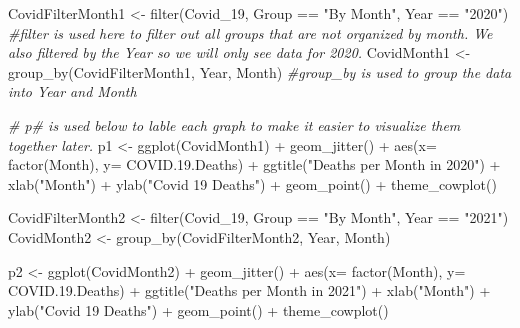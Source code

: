 \documentclass[
]{article}
\newenvironment{Shaded}{\begin{snugshade}}{\end{snugshade}}
\newcommand{\AttributeTok}[1]{\textcolor[rgb]{0.77,0.63,0.00}{#1}}
\newcommand{\CommentTok}[1]{\textcolor[rgb]{0.56,0.35,0.01}{\textit{#1}}}
\newcommand{\FloatTok}[1]{\textcolor[rgb]{0.00,0.00,0.81}{#1}}
\newcommand{\FunctionTok}[1]{\textcolor[rgb]{0.00,0.00,0.00}{#1}}
\newcommand{\NormalTok}[1]{#1}
\newcommand{\OtherTok}[1]{\textcolor[rgb]{0.56,0.35,0.01}{#1}}
\newcommand{\SpecialCharTok}[1]{\textcolor[rgb]{0.00,0.00,0.00}{#1}}
\newcommand{\StringTok}[1]{\textcolor[rgb]{0.31,0.60,0.02}{#1}}
\begin{document}
\begin{Shaded}
\begin{Highlighting}[]
\NormalTok{CovidFilterMonth1 }\OtherTok{\textless{}{-}} \FunctionTok{filter}\NormalTok{(Covid\_19, Group }\SpecialCharTok{==} \StringTok{"By Month"}\NormalTok{, Year }\SpecialCharTok{==} \StringTok{"2020"}\NormalTok{) }\CommentTok{\#filter is used here to filter out all groups that are not organized by month. We also filtered by the Year so we will only see data for 2020.}
\NormalTok{CovidMonth1 }\OtherTok{\textless{}{-}} \FunctionTok{group\_by}\NormalTok{(CovidFilterMonth1, Year, Month) }\CommentTok{\#group\_by is used to group the data into Year and Month}

\CommentTok{\# p\# is used below to lable each graph to make it easier to visualize them together later.}
\NormalTok{p1 }\OtherTok{\textless{}{-}} \FunctionTok{ggplot}\NormalTok{(CovidMonth1) }\SpecialCharTok{+}
  \FunctionTok{geom\_jitter}\NormalTok{() }\SpecialCharTok{+} 
  \FunctionTok{aes}\NormalTok{(}\AttributeTok{x=} \FunctionTok{factor}\NormalTok{(Month), }\AttributeTok{y=}\NormalTok{ COVID.}\FloatTok{19.}\NormalTok{Deaths) }\SpecialCharTok{+} 
    \FunctionTok{ggtitle}\NormalTok{(}\StringTok{"Deaths per Month in 2020"}\NormalTok{) }\SpecialCharTok{+} 
  \FunctionTok{xlab}\NormalTok{(}\StringTok{"Month"}\NormalTok{) }\SpecialCharTok{+} 
  \FunctionTok{ylab}\NormalTok{(}\StringTok{"Covid 19 Deaths"}\NormalTok{) }\SpecialCharTok{+} 
  \FunctionTok{geom\_point}\NormalTok{() }\SpecialCharTok{+} 
  \FunctionTok{theme\_cowplot}\NormalTok{()}

\NormalTok{CovidFilterMonth2 }\OtherTok{\textless{}{-}} \FunctionTok{filter}\NormalTok{(Covid\_19, Group }\SpecialCharTok{==} \StringTok{"By Month"}\NormalTok{, Year }\SpecialCharTok{==} \StringTok{"2021"}\NormalTok{)}
\NormalTok{CovidMonth2 }\OtherTok{\textless{}{-}} \FunctionTok{group\_by}\NormalTok{(CovidFilterMonth2, Year, Month)}

\NormalTok{p2 }\OtherTok{\textless{}{-}} \FunctionTok{ggplot}\NormalTok{(CovidMonth2) }\SpecialCharTok{+}
  \FunctionTok{geom\_jitter}\NormalTok{() }\SpecialCharTok{+} 
  \FunctionTok{aes}\NormalTok{(}\AttributeTok{x=} \FunctionTok{factor}\NormalTok{(Month), }\AttributeTok{y=}\NormalTok{ COVID.}\FloatTok{19.}\NormalTok{Deaths) }\SpecialCharTok{+} 
    \FunctionTok{ggtitle}\NormalTok{(}\StringTok{"Deaths per Month in 2021"}\NormalTok{) }\SpecialCharTok{+} 
  \FunctionTok{xlab}\NormalTok{(}\StringTok{"Month"}\NormalTok{) }\SpecialCharTok{+} 
  \FunctionTok{ylab}\NormalTok{(}\StringTok{"Covid 19 Deaths"}\NormalTok{) }\SpecialCharTok{+} 
  \FunctionTok{geom\_point}\NormalTok{() }\SpecialCharTok{+} 
  \FunctionTok{theme\_cowplot}\NormalTok{()}


\end{Highlighting}
\end{Shaded}
\end{document}
